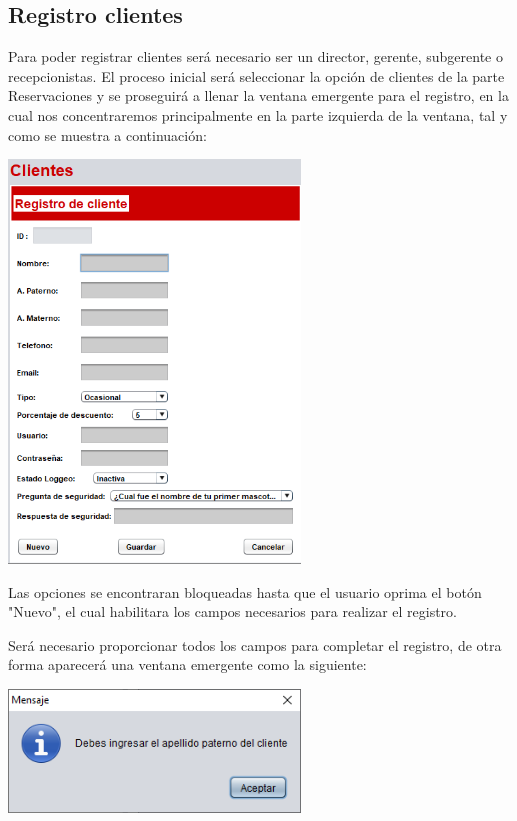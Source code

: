 \documentclass[12pt]{article}
\begin{document}
\begin{flushleft}
\section{Registro clientes}
\textsf{Para poder registrar clientes será necesario ser un director, gerente, subgerente o recepcionistas. El proceso inicial será seleccionar la opción de clientes de la parte Reservaciones y se proseguirá a llenar la ventana emergente para el registro, en la cual nos concentraremos principalmente en la parte izquierda de la ventana, tal y como se muestra a continuación: }
\vspace{0.5cm}
\begin{center}
\includegraphics[width=7.75cm]{cliente.png}
\end{center}
\vspace{0.5cm}
\textsf{Las opciones se encontraran bloqueadas hasta que el usuario oprima el botón "Nuevo", el cual habilitara los campos necesarios para realizar el registro.}

\vspace{0.5cm} 
\textsf{Será necesario proporcionar todos los campos para completar el registro, de otra forma aparecerá una ventana emergente como la siguiente:}

\vspace{0.5cm}
\begin{center}
\includegraphics[width=7.75cm]{e_cliente.png}
\end{center}


\end{flushleft}
\end{document}
